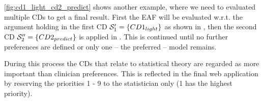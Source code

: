 \autoref{fig:cd1_light_cd2_predict} shows another example, where we need to evaluated multiple \glspl{CD} to get a final result. First the \gls{EAF} will be evaluated w.r.t. the argument holding in the first \gls{CD} $\S_1' = \{CD1_{light}\}$ as shown in , then the second \gls{CD} $\S_2'' = \{CD2_{predict}\}$ is applied in . This is continued until no further preferences are defined or only one -- the preferred -- model remains.

During this process the \glspl{CD} that relate to statistical theory are regarded as more important than clinician preferences. This is reflected in the final web application by reserving the priorities 1 - 9 to the statistician only (1 has the highest priority).

